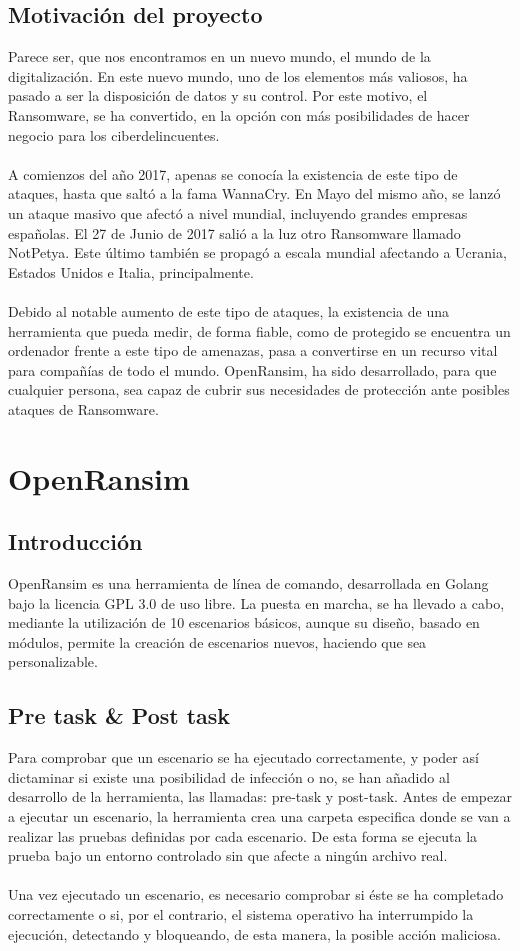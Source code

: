 \documentclass[a4paper,12pt]{article}
\begin{document}
\subsection{Motivación del proyecto}
Parece ser, que nos encontramos en un nuevo mundo, el mundo de la digitalización. En este nuevo mundo, uno de los elementos más valiosos, ha pasado a ser la disposición de datos y su control. Por este motivo, el Ransomware, se ha convertido, en la opción con más posibilidades de hacer negocio para los ciberdelincuentes.\\\\
A comienzos del año 2017, apenas se conocía la existencia de este tipo de ataques, hasta que saltó a la fama WannaCry. En Mayo del mismo año, se lanzó un ataque masivo que afectó a nivel mundial, incluyendo grandes empresas españolas. El 27 de Junio de 2017 salió a la luz otro Ransomware llamado NotPetya. Este último también se propagó a escala mundial afectando a Ucrania, Estados Unidos e Italia, principalmente.\\\\
Debido al notable aumento de este tipo de ataques, la existencia de una herramienta que pueda medir, de forma fiable, como de protegido se encuentra un ordenador frente a este tipo de amenazas, pasa a convertirse en un recurso vital para compañías de todo el mundo. 
OpenRansim, ha sido desarrollado, para que cualquier persona, sea capaz de cubrir sus necesidades de protección ante posibles ataques de Ransomware. 

\section{OpenRansim}
\subsection{Introducción}
OpenRansim es una herramienta de línea de comando, desarrollada en Golang bajo la licencia GPL 3.0 de uso libre. La puesta en marcha, se ha llevado a cabo, mediante la utilización de 10 escenarios básicos, aunque su diseño, basado en módulos, permite la creación de escenarios nuevos, haciendo que sea personalizable.
\subsection{Pre task \& Post task}
Para comprobar que un escenario se ha ejecutado correctamente, y poder así dictaminar si existe una posibilidad de infección o no, se han añadido al desarrollo de la herramienta, las llamadas: pre-task y post-task. Antes de empezar a ejecutar un escenario, la herramienta crea una carpeta especifica donde se van a realizar las pruebas definidas por cada escenario. De esta forma se ejecuta la prueba bajo un entorno controlado sin que afecte a ningún archivo real.\\\\
Una vez ejecutado un escenario, es necesario comprobar si éste se ha completado correctamente o si, por el contrario, el sistema operativo ha interrumpido la ejecución, detectando y bloqueando, de esta manera, la posible acción maliciosa.  
\end{document}
